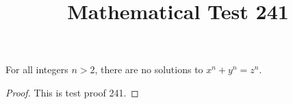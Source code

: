 \documentclass{amsart}
\begin{document}
\title{Mathematical Test 241}
\begin{theorem}
For all integers $n > 2$, there are no solutions to $x^n + y^n = z^n$.
\end{theorem}
\begin{proof}
This is test proof 241.
\end{proof}
\end{document}
